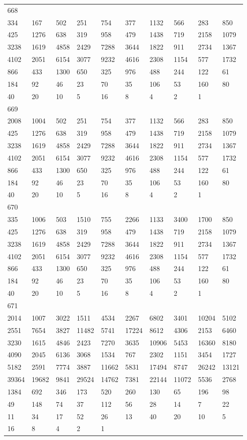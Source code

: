 \begin{longtable}{*{10}{l}}
668&&&&&&&&&\\
334& 167& 502& 251& 754& 377& 1132& 566& 283& 850\\
425& 1276& 638& 319& 958& 479& 1438& 719& 2158& 1079\\
3238& 1619& 4858& 2429& 7288& 3644& 1822& 911& 2734& 1367\\
4102& 2051& 6154& 3077& 9232& 4616& 2308& 1154& 577& 1732\\
866& 433& 1300& 650& 325& 976& 488& 244& 122& 61\\
184& 92& 46& 23& 70& 35& 106& 53& 160& 80\\
40& 20& 10& 5& 16& 8& 4& 2& 1& \\

669&&&&&&&&&\\
2008& 1004& 502& 251& 754& 377& 1132& 566& 283& 850\\
425& 1276& 638& 319& 958& 479& 1438& 719& 2158& 1079\\
3238& 1619& 4858& 2429& 7288& 3644& 1822& 911& 2734& 1367\\
4102& 2051& 6154& 3077& 9232& 4616& 2308& 1154& 577& 1732\\
866& 433& 1300& 650& 325& 976& 488& 244& 122& 61\\
184& 92& 46& 23& 70& 35& 106& 53& 160& 80\\
40& 20& 10& 5& 16& 8& 4& 2& 1& \\

670&&&&&&&&&\\
335& 1006& 503& 1510& 755& 2266& 1133& 3400& 1700& 850\\
425& 1276& 638& 319& 958& 479& 1438& 719& 2158& 1079\\
3238& 1619& 4858& 2429& 7288& 3644& 1822& 911& 2734& 1367\\
4102& 2051& 6154& 3077& 9232& 4616& 2308& 1154& 577& 1732\\
866& 433& 1300& 650& 325& 976& 488& 244& 122& 61\\
184& 92& 46& 23& 70& 35& 106& 53& 160& 80\\
40& 20& 10& 5& 16& 8& 4& 2& 1& \\

671&&&&&&&&&\\
2014& 1007& 3022& 1511& 4534& 2267& 6802& 3401& 10204& 5102\\
2551& 7654& 3827& 11482& 5741& 17224& 8612& 4306& 2153& 6460\\
3230& 1615& 4846& 2423& 7270& 3635& 10906& 5453& 16360& 8180\\
4090& 2045& 6136& 3068& 1534& 767& 2302& 1151& 3454& 1727\\
5182& 2591& 7774& 3887& 11662& 5831& 17494& 8747& 26242& 13121\\
39364& 19682& 9841& 29524& 14762& 7381& 22144& 11072& 5536& 2768\\
1384& 692& 346& 173& 520& 260& 130& 65& 196& 98\\
49& 148& 74& 37& 112& 56& 28& 14& 7& 22\\
11& 34& 17& 52& 26& 13& 40& 20& 10& 5\\
16& 8& 4& 2& 1& \\


\end{longtable}
